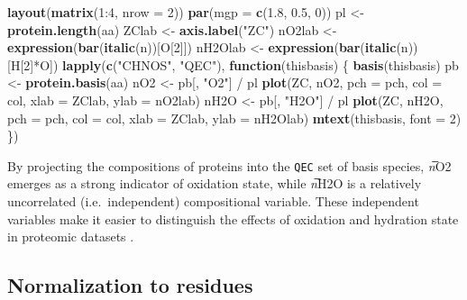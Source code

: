 \documentclass[]{tufte-handout}
\newenvironment{Shaded}{}{}
\newcommand{\KeywordTok}[1]{\textcolor[rgb]{0.00,0.44,0.13}{\textbf{#1}}}
\newcommand{\DataTypeTok}[1]{\textcolor[rgb]{0.56,0.13,0.00}{#1}}
\newcommand{\DecValTok}[1]{\textcolor[rgb]{0.25,0.63,0.44}{#1}}
\newcommand{\FloatTok}[1]{\textcolor[rgb]{0.25,0.63,0.44}{#1}}
\newcommand{\StringTok}[1]{\textcolor[rgb]{0.25,0.44,0.63}{#1}}
\newcommand{\ControlFlowTok}[1]{\textcolor[rgb]{0.00,0.44,0.13}{\textbf{#1}}}
\newcommand{\OperatorTok}[1]{\textcolor[rgb]{0.40,0.40,0.40}{#1}}
\newcommand{\NormalTok}[1]{#1}
\begin{document}
\begin{Shaded}
\begin{Highlighting}[]
\KeywordTok{layout}\NormalTok{(}\KeywordTok{matrix}\NormalTok{(}\DecValTok{1}\OperatorTok{:}\DecValTok{4}\NormalTok{, }\DataTypeTok{nrow =} \DecValTok{2}\NormalTok{))}
\KeywordTok{par}\NormalTok{(}\DataTypeTok{mgp =} \KeywordTok{c}\NormalTok{(}\FloatTok{1.8}\NormalTok{, }\FloatTok{0.5}\NormalTok{, }\DecValTok{0}\NormalTok{))}
\NormalTok{pl <-}\StringTok{ }\KeywordTok{protein.length}\NormalTok{(aa)}
\NormalTok{ZClab <-}\StringTok{ }\KeywordTok{axis.label}\NormalTok{(}\StringTok{"ZC"}\NormalTok{)}
\NormalTok{nO2lab <-}\StringTok{ }\KeywordTok{expression}\NormalTok{(}\KeywordTok{bar}\NormalTok{(}\KeywordTok{italic}\NormalTok{(n))[O[}\DecValTok{2}\NormalTok{]])}
\NormalTok{nH2Olab <-}\StringTok{ }\KeywordTok{expression}\NormalTok{(}\KeywordTok{bar}\NormalTok{(}\KeywordTok{italic}\NormalTok{(n))[H[}\DecValTok{2}\NormalTok{]}\OperatorTok{*}\NormalTok{O])}
\KeywordTok{lapply}\NormalTok{(}\KeywordTok{c}\NormalTok{(}\StringTok{"CHNOS"}\NormalTok{, }\StringTok{"QEC"}\NormalTok{), }\ControlFlowTok{function}\NormalTok{(thisbasis) \{}
  \KeywordTok{basis}\NormalTok{(thisbasis)}
\NormalTok{  pb <-}\StringTok{ }\KeywordTok{protein.basis}\NormalTok{(aa)}
\NormalTok{  nO2 <-}\StringTok{ }\NormalTok{pb[, }\StringTok{"O2"}\NormalTok{] }\OperatorTok{/}\StringTok{ }\NormalTok{pl}
  \KeywordTok{plot}\NormalTok{(ZC, nO2, }\DataTypeTok{pch =}\NormalTok{ pch, }\DataTypeTok{col =}\NormalTok{ col, }\DataTypeTok{xlab =}\NormalTok{ ZClab, }\DataTypeTok{ylab =}\NormalTok{ nO2lab)}
\NormalTok{  nH2O <-}\StringTok{ }\NormalTok{pb[, }\StringTok{"H2O"}\NormalTok{] }\OperatorTok{/}\StringTok{ }\NormalTok{pl}
  \KeywordTok{plot}\NormalTok{(ZC, nH2O, }\DataTypeTok{pch =}\NormalTok{ pch, }\DataTypeTok{col =}\NormalTok{ col, }\DataTypeTok{xlab =}\NormalTok{ ZClab, }\DataTypeTok{ylab =}\NormalTok{ nH2Olab)}
  \KeywordTok{mtext}\NormalTok{(thisbasis, }\DataTypeTok{font =} \DecValTok{2}\NormalTok{)}
\NormalTok{\})}
\end{Highlighting}
\end{Shaded}

By projecting the compositions of proteins into the \texttt{QEC} set of
basis species, \emph{n}̅O2 emerges as a strong indicator of oxidation
state, while \emph{n}̅H2O is a relatively uncorrelated (i.e.~independent)
compositional variable. These independent variables make it easier to
distinguish the effects of oxidation and hydration state in proteomic
datasets \citep{Dic17}.

\subsection{Normalization to residues}\label{normalization-to-residues}
\end{document}
